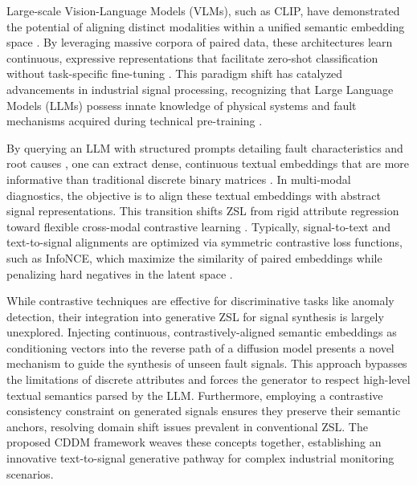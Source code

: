 Large-scale Vision-Language Models (VLMs), such as CLIP, have demonstrated the potential of aligning distinct modalities within a unified semantic embedding space \cite{mikolov2013efficient}. By leveraging massive corpora of paired data, these architectures learn continuous, expressive representations that facilitate zero-shot classification without task-specific fine-tuning \cite{radford2021learning}. This paradigm shift has catalyzed advancements in industrial signal processing, recognizing that Large Language Models (LLMs) \cite{brown2020language,devlin2019bert} possess innate knowledge of physical systems and fault mechanisms acquired during technical pre-training \cite{liu2021generalized,liu2023dsd}.

By querying an LLM with structured prompts detailing fault characteristics and root causes \cite{shi2024unseen,luo2024self,qin2024feature}, one can extract dense, continuous textual embeddings that are more informative than traditional discrete binary matrices \cite{brown2020language}. In multi-modal diagnostics, the objective is to align these textual embeddings with abstract signal representations. This transition shifts ZSL from rigid attribute regression toward flexible cross-modal contrastive learning \cite{chen2020simple}. Typically, signal-to-text and text-to-signal alignments are optimized via symmetric contrastive loss functions, such as InfoNCE, which maximize the similarity of paired embeddings while penalizing hard negatives in the latent space \cite{oord2018representation,chen2020simple}.

While contrastive techniques are effective for discriminative tasks like anomaly detection, their integration into generative ZSL for signal synthesis is largely unexplored. Injecting continuous, contrastively-aligned semantic embeddings as conditioning vectors into the reverse path of a diffusion model presents a novel mechanism to guide the synthesis of unseen fault signals. This approach bypasses the limitations of discrete attributes and forces the generator to respect high-level textual semantics parsed by the LLM. Furthermore, employing a contrastive consistency constraint on generated signals ensures they preserve their semantic anchors, resolving domain shift issues prevalent in conventional ZSL. The proposed CDDM framework weaves these concepts together, establishing an innovative text-to-signal generative pathway for complex industrial monitoring scenarios.